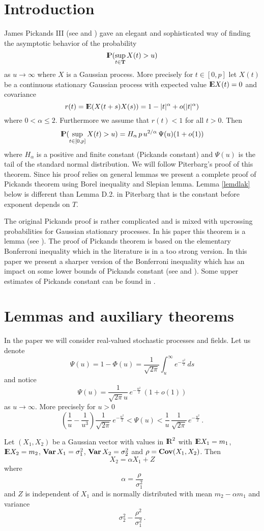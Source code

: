 \section{Introduction}
James Pickands III (see \cite{pi:69a} and \cite{pi:69b}) gave an elegant and sophisticated way of finding the asymptotic behavior of the probability 
$$ 
{\rm I\hspace{-0.8mm}P}(\sup_{t\in {\bf T}}X(t)>u)
$$
as $u\rightarrow\infty$ where $X$ is a Gaussian process. More precisely for $t\in [0, p]$ let $X(t)$ be a continuous stationary Gaussian 
process with expected value ${\rm I\hspace{-0.8mm}E} X(t)=0$ and covariance 
$$
r(t)={\rm I\hspace{-0.8mm}E}(X(t+s)X(s))=1-|t|^\alpha+o(|t|^\alpha)
$$
where $0<\alpha\leq 2$.
Furthermore we assume that $r(t)<1$ for all $t>0$. Then
$$
{\rm I\hspace{-0.8mm}P}(\sup_{t\in [0,p]} X(t)>u)=H_\alpha\, p\, u^{2/\alpha}\,\Psi(u)(1+o(1))
$$
where $H_{\alpha}$ is a positive and finite constant (Pickands constant) and $\Psi(u)$ is the tail of the standard normal distribution.
We will follow Piterbarg's
proof of this theorem. Since his proof relies on general lemmas we present a complete proof of Pickands
theorem using Borel inequality and Slepian lemma. 
Lemma \ref{lemdlak} below is different than Lemma D.2. in Piterbarg \cite{pit:96} that is the constant before 
exponent depends on $T$.

The original Pickands proof is rather complicated
and is mixed with upcrossing probabilities for Gaussian stationary processes. In his paper this
theorem is a lemma (see \cite{pi:69b}). The proof of Pickands theorem is based on the elementary Bonferroni
inequality which in the literature is in a too strong version. In this paper we present a sharper version
of the Bonferroni inequality which has an impact on some lower bounds of Pickands constant (see \cite{de:mi:ro:03} and \cite{sh:96}). Some upper estimates of Pickands constant can be found in \cite{de:ki:08}.

\section{Lemmas and auxiliary theorems}
In the paper we will consider real-valued stochastic processes and fields.
Let us denote
$$
\Psi(u)=1-\Phi(u)=\frac{1}{\sqrt{2\pi}}\int_u^{\infty}e^{-\frac{s^2}{2}}\,ds
$$
and notice
\begin{equation}\label{glasym}
\Psi(u)=\frac{1}{\sqrt{2\pi}u}\,e^{-\frac{u^2}{2}}\,(1+o(1))
\end{equation}
as $u\rightarrow\infty$. More precisely for $u>0$
$$
\left(\frac{1}{u}-\frac{1}{u^3}\right)\frac{1}{\sqrt{2\pi}}
\,e^{-\frac{u^2}{2}}< \Psi(u)<\frac{1}{u}\,\frac{1}{\sqrt{2\pi}}
\,e^{-\frac{u^2}{2}}\,.
$$
\begin{lemma}\label{gausv}
Let $(X_1,X_2)$ be a Gaussian vector with values in ${\rm I\hspace{-0.8mm}R}^2$ with ${\rm I\hspace{-0.8mm}E} X_1=m_1$, ${\rm I\hspace{-0.8mm}E} X_2=m_2$,
${\bf Var\,} X_1=\sigma_1^2$, ${\bf Var\,} X_2=\sigma_2^2$ and $\rho={\bf Cov}(X_1,X_2)$.
Then
$$
X_2=\alpha X_1+Z
$$
where $$
\alpha=\frac{\rho}{\sigma_1^2}
$$
and $Z$ is independent of $X_1$ and is normally distributed with mean $m_2-\alpha m_1$ and
variance 
$$
\sigma_2^2-\frac{\rho^2}{\sigma_1^2}\,.
$$
\end{lemma}


